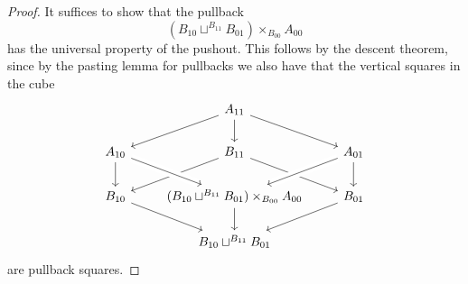 \begin{proof}
It suffices to show that the pullback 
\begin{equation*}
(B_{10}\sqcup^{B_{11}} B_{01})\times_{B_{00}}A_{00}
\end{equation*}
has the universal property of the pushout. This follows by the descent theorem, since by the pasting lemma for pullbacks we also have that the vertical squares in the cube
\begin{equation*}
\begin{tikzcd}
& A_{11} \arrow[dl] \arrow[dr] \arrow[d] \\
A_{10} \arrow[d] & B_{11} \arrow[dl] \arrow[dr] & A_{01} \arrow[dl,crossing over] \arrow[d] \\
B_{10} \arrow[dr] & (B_{10}\sqcup^{B_{11}} B_{01})\times_{B_{00}}A_{00} \arrow[d] \arrow[from=ul,crossing over] & B_{01} \arrow[dl] \\
& B_{10}\sqcup^{B_{11}} B_{01}
\end{tikzcd}
\end{equation*}
are pullback squares.
\end{proof}

